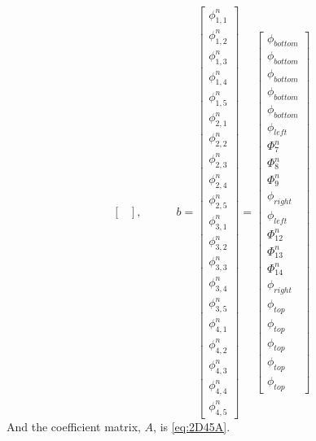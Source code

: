 \begin{equation}
\begin{bmatrix}
   \end{bmatrix}
    , \qquad \quad
b= \begin{bmatrix}
	\phi^{n}_{1,1} \\ \phi^{n}_{1,2} \\ \phi^{n}_{1,3} \\ \phi^{n}_{1,4} \\ \phi^{n}_{1,5} \\ \phi^{n}_{2,1} \\ \phi^{n}_{2,2} \\ \phi^{n}_{2,3} \\ \phi^{n}_{2,4} \\ \phi^{n}_{2,5} \\ \phi^{n}_{3,1} \\ \phi^{n}_{3,2} \\ \phi^{n}_{3,3} \\ \phi^{n}_{3,4} \\ \phi^{n}_{3,5} \\ \phi^{n}_{4,1} \\ \phi^{n}_{4,2} \\ \phi^{n}_{4,3} \\ \phi^{n}_{4,4} \\ \phi^{n}_{4,5} 
\end{bmatrix}
=
\begin{bmatrix}
	\phi_{bottom} \\ \phi_{bottom} \\ \phi_{bottom} \\ \phi_{bottom} \\ \phi_{bottom} \\ \phi_{left} \\ \Phi^{n}_{7} \\ \Phi^{n}_{8} \\ \Phi^{n}_{9} \\ \phi_{right} \\ \phi_{left} \\ \Phi^{n}_{12} \\ \Phi^{n}_{13} \\ \Phi^{n}_{14} \\ \phi_{right} \\ \phi_{top} \\ \phi_{top} \\ \phi_{top} \\ \phi_{top} \\ \phi_{top} 
\end{bmatrix}
\label{eq:2D45xb}
\end{equation}
And the coefficient matrix, $A$, is \ref{eq:2D45A}. 
